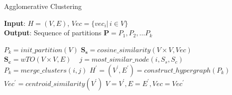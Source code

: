 \begin{algorithm}\label{alg: clustering}
    \caption{Agglomerative Clustering }\label{alg:cap}
    \hspace*{\algorithmicindent} \textbf{Input}: $H=(V, E)$, $Vec=\{vec_i |\, i \in V\}$ \\
    \hspace*{\algorithmicindent} \textbf{Output}: Sequence of partitions $\mathbf{P}=P_1, P_2, \dots P_k$ \\
    \begin{algorithmic}[1]
        \State$P_k = init\_partition(V)$ 
        \State$\mathbf{S_s} = cosine\_similarity(V\times V, Vec)$ 
        \State$\mathbf{S_c} = wTO(V\times V, E)$ \
            \State$j = most\_similar\_node(i, S_s, S_c)$ 
            \State$P_k = merge\_clusters(i, j)$ 
        \EndFor
        \State$H^\prime=(V^\prime, E^\prime) = construct\_hypergraph(P_k)$ 
        \State$Vec^\prime = centroid\_similarity(V^\prime)$
        \State$V=V^\prime, E=E^\prime, Vec=Vec^\prime$ 
    \EndWhile
    \end{algorithmic}
\end{algorithm}


